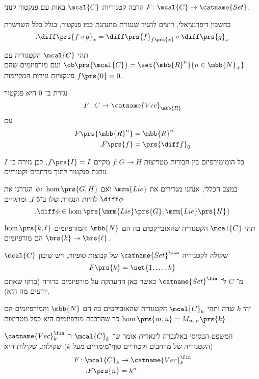 \documentclass[10pt, twoside]{book}
\newcommand{\Lie}{\mrm{Lie}}
\begin{document}
\begin{remark}
הרבה קטגוריות
$\mcal{C}$
באות עם פנקטור קנוני
$F \colon \mcal{C} \to \catname{Set}$.
\end{remark}

\begin{example}
בחשבון דיפרנציאלי, רוצים להגיד שנגזרת מתנהגת כמו פנקטור, בגלל כלל השרשרת
\[\text{.}\diff \prs{f \circ g}_x = \diff \prs{f}_{f\prs{x}} \circ \diff\prs{g}_x\]
\end{example}

\begin{example}
תהי
$\mcal{C}$
הקטגוריה עם
$\ob\prs{\mcal{C}} = \set{\mbb{R}^n}{n \in \mbb{N}_+}$
ועם מורפיזמים שהם פונקציות גזירות המקיימות
$f\prs{0} = 0$.

נגזרת ב־%
$0$
היא פנקטור
\[F \colon C \to \catname{Vec}_{\mbb{R}}\]
עם
\begin{align*}
F\prs{\mbb{R}^n} &= \mbb{R}^n \\
\text{.} F\prs{f} &= \prs{\diff f}_0
\end{align*}
\end{example}

\begin{example}
כל הומומורפיזם בין חבורות מטריצות
$f \colon G \to H$
מקיים
$f\prs{I} = I$,
לכן גזירה ב־%
$I$
נותנת פנקטור לתוך מרחבים וקטוריים.

במצב הכללי, אנחנו מגדירים את
$\Lie$
ואם
$\phi \colon \hom\prs{G,H}$
הגדרנו את
$\diff \phi$
להיות הנגזרת שלו ב־5
$I$,
ומתקיים
\[\text{.} \diff \phi \in \hom\prs{\Lie\prs{G}, \Lie\prs{H}}\]
\end{example}

\begin{example}
תהי
$\mcal{C}$
הקטגוריה שהאובייקטים בה הם
$\mbb{N}$
והמורפיזמים
$\hom\prs{k,\ell}$
הם מורפיזמים
$\brs{k} \to \brs{\ell}$.

$\mcal{C}$
שקולה לקטגוריה
$\catname{Set}^\fin$
של קבוצות סופיות, ויש שיכון
\[F\prs{k} = \set{1, \ldots, k}\]
מ־%
$C$
ל־%
$\catname{Set}^\fin$
כאשר כאן ההעתקה על מורפיזמים ברורה (בדקו שאתם יודעים מה היא).
\end{example}

\begin{example}
יהי
$k$
שדה ותהי
$\mcal{C}_k$
הקטגוריה שהאוביקטים בה הם
$\mbb{N}$
והמורפיזמים הם
$\hom\prs{m,n} = M_{m,n}\prs{k}$
כך שהרכבת מורפיזמים היא כפל מטריצות.

המשפט הבסיסי באלגברה לינארית אומר ש־%
$\mcal{C}_k$
ו־%
$\catname{Vec}_k^\fin$
(הקטגוריה של מרחבים וקטוריים סוף־מימדיים מעל
$k$)
שקולות. שקילות היא
\begin{align*}
F \colon \mcal{C}_k &\to \catname{Vec}_k^\fin \\
\text{.} F\prs{n} &= k^n
\end{align*}
\end{example}
\end{document}
